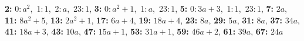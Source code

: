 \textsf{\bfseries 2:} 0:\,$a^2$,\ 1:\,$1$,\ 2:\,$a$,\ 23:\,$1$, \textsf{\bfseries 3:} 0:\,$a^2 + 1$,\ 1:\,$a$,\ 23:\,$1$, \textsf{\bfseries 5:} 0:\,$3a + 3$,\ 1:\,$1$,\ 23:\,$1$, \textsf{\bfseries 7:} $2a$, \textsf{\bfseries 11:} $8a^2 + 5$, \textsf{\bfseries 13:} $2a^2 + 1$, \textsf{\bfseries 17:} $6a + 4$, \textsf{\bfseries 19:} $18a + 4$, \textsf{\bfseries 23:} $8a$, \textsf{\bfseries 29:} $5a$, \textsf{\bfseries 31:} $8a$, \textsf{\bfseries 37:} $34a$, \textsf{\bfseries 41:} $18a + 3$, \textsf{\bfseries 43:} $10a$, \textsf{\bfseries 47:} $15a + 1$, \textsf{\bfseries 53:} $31a + 1$, \textsf{\bfseries 59:} $46a + 2$, \textsf{\bfseries 61:} $39a$, \textsf{\bfseries 67:} $24a$